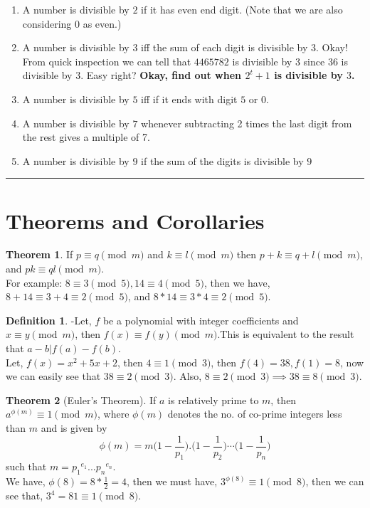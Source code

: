 \documentclass[a4paper,oneside,12 pt]{book}
\theoremstyle{definition}
\theoremstyle{definition}
\theoremstyle{definition}
\newtheorem{defn}{Definition}[section]
\newtheorem{theorem}{Theorem} [section]
\begin{document}
\begin{enumerate}

\item{A number is divisible by $2$ if it has even end digit. (Note that we are also considering $0$ as even.)}
\item{A number is divisible by $3$ iff the sum of each digit is divisible by 3. Okay! From quick inspection we can tell that $4465782$ is divisible by $3$ since $36$ is divisible by $3$. Easy right? }
                    \textbf{Okay, find out when $2^t+1$ is divisible by $3$.}
\item{A number is divisible by $5$ iff if it ends with digit $5$ or $0$.}
\item{A number is divisible by $7$ whenever subtracting 2 times the last digit from the rest gives a multiple of 7.}
\item{A number is divisible by $9$ if the sum of the digits is divisible by $9$}
\end{enumerate}
\rule{\textwidth}{1pt}


\section{Theorems and Corollaries}

\begin{theorem}
If $p \equiv q \pmod{m}$ and $k \equiv l \pmod{m}$ then $p+k \equiv q+l \pmod{m}$, and $pk \equiv ql \pmod{m}$. \\
\textsf{For example: $8 \equiv 3 \pmod{5}, 14 \equiv 4 \pmod{5}$, then we have, $8+14 \equiv 3+4 \equiv 2 \pmod{5} $, and $8*14 \equiv 3*4 \equiv 2 \pmod{5}$.}
\end{theorem}

\begin{defn}



-Let, $f$ be a polynomial with integer coefficients and $x\equiv y \pmod{m} $, then $f(x) \equiv f(y) \pmod{m}.$This is equivalent to the result that $a-b|f(a)-f(b)$.\\
\textsf{Let, $f(x)=x^2+5x+2$, then $4 \equiv 1 \pmod{3}$, then $f(4)=38,f(1)=8$, now we can easily see that $38 \equiv 2 \pmod{3}$. Also, $8 \equiv 2 \pmod{3} \implies 38 \equiv 8 \pmod{3}$.}

\end{defn}


\begin{theorem} [Euler's Theorem]
If $a$ is relatively prime to $m$, then $a^{\phi(m)} \equiv 1 \pmod{m}$, where $\phi{(m)}$ denotes the no. of co-prime integers less than $m$ and is given by
$$\phi(m)=m\bigg(1-\frac{1}{p_1}\bigg).\bigg(1-\frac{1}{p_2}\bigg)\cdots \bigg(1-\frac{1}{p_n}\bigg)$$
such that $m={p_1}^{e_1}...{p_n}^{e_n}$.\\
\textsf{We have, $\phi{(8)}=8*\frac{1}{2}=4$, then we must have, $3^{\phi{(8)}} \equiv 1 \pmod{8}$, then we can see that, $3^4=81 \equiv 1 \pmod{8}.$}

\end{theorem}
\end{document}
